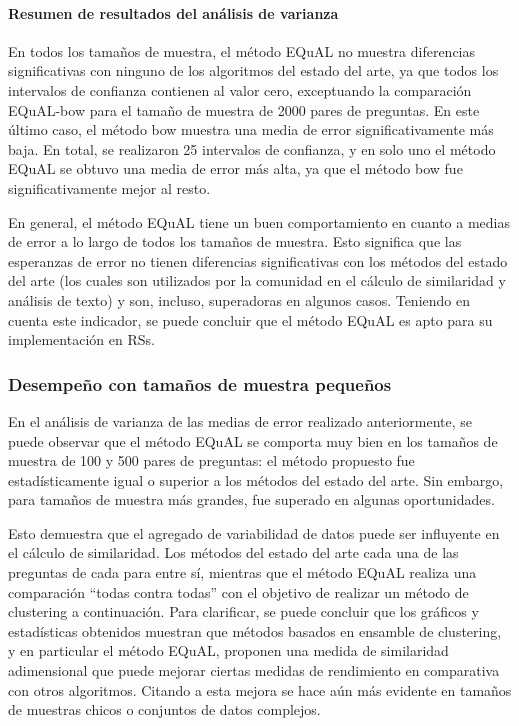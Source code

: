 \bigskip
\paragraph{Resumen de resultados del análisis de varianza}
En todos los tamaños de muestra, el método EQuAL no muestra diferencias significativas con ninguno de los algoritmos del estado del arte, ya que todos los intervalos de confianza contienen al valor cero, exceptuando la comparación EQuAL-bow para el tamaño de muestra de 2000 pares de preguntas. En este último caso, el método bow muestra una media de error significativamente más baja. En total, se realizaron 25 intervalos de confianza, y en solo uno el método EQuAL se obtuvo una media de error más alta, ya que el método bow fue significativamente mejor al resto.

\bigskip En general, el método EQuAL tiene un buen comportamiento en cuanto a medias de error a lo largo de todos los tamaños de muestra. Esto significa que las esperanzas de error no tienen diferencias significativas con los métodos del estado del arte (los cuales son utilizados por la comunidad en el cálculo de similaridad y análisis de texto) y son, incluso, superadoras en algunos casos. Teniendo en cuenta este indicador, se puede concluir que el método EQuAL es apto para su implementación en RSs.

\subsubsection{Desempeño con tamaños de muestra pequeños}
En el análisis de varianza de las medias de error realizado anteriormente, se puede observar que el método EQuAL se comporta muy bien en los tamaños de muestra de 100 y 500 pares de preguntas: el método propuesto fue estadísticamente igual o superior a los métodos del estado del arte. Sin embargo, para tamaños de muestra más grandes, fue superado en algunas oportunidades.

\bigskip Esto demuestra que el agregado de variabilidad de datos puede ser influyente en el cálculo de similaridad. Los métodos del estado del arte cada una de las preguntas de cada para entre sí, mientras que el método EQuAL realiza una comparación “todas contra todas” con el objetivo de realizar un método de clustering a continuación. Para clarificar, se puede concluir que los gráficos y estadísticas obtenidos muestran que métodos basados en ensamble de clustering, y en particular el método EQuAL,  proponen una medida de similaridad adimensional que puede mejorar ciertas medidas de rendimiento en comparativa con otros algoritmos. Citando a \cite{fred2005combining} esta mejora se hace aún más evidente en tamaños de muestras chicos o conjuntos de datos complejos.

